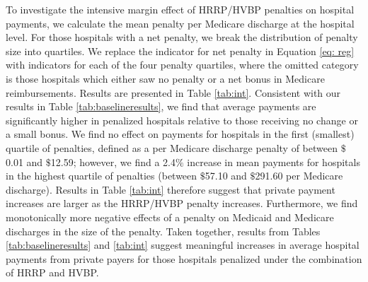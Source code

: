 \documentclass[12pt]{article}
\begin{document}
To investigate the intensive margin effect of HRRP/HVBP penalties on hospital payments, we calculate the mean penalty per Medicare discharge at the hospital level.  For those hospitals with a net penalty, we break the distribution of penalty size into quartiles.  We replace the indicator for net penalty in Equation \ref{eq: reg} with indicators for each of the four penalty quartiles, where the omitted category is those hospitals which either saw no penalty or a net bonus in Medicare reimbursements. Results are presented in Table \ref{tab:int}.  Consistent with our results in Table \ref{tab:baselineresults}, we find that average payments are significantly higher in penalized hospitals relative to those receiving no change or a small bonus.  We find no effect on payments for hospitals in the first (smallest) quartile of penalties, defined as a per Medicare discharge penalty of between $\$$0.01 and $\$$12.59; however, we find a 2.4$\%$ increase in mean payments for hospitals in the highest quartile of penalties (between $\$$57.10 and $\$$291.60 per Medicare discharge).  Results in Table \ref{tab:int} therefore suggest that private payment increases are larger as the HRRP/HVBP penalty increases. Furthermore, we find monotonically more negative effects of a penalty on Medicaid and Medicare discharges in the size of the penalty.  Taken together, results from Tables \ref{tab:baselineresults} and \ref{tab:int} suggest meaningful increases in average hospital payments from private payers for those hospitals penalized under the combination of HRRP and HVBP.
\end{document}
